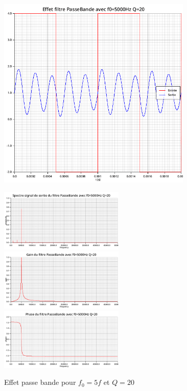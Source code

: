 \documentclass{article}
\begin{document}
\begin{figure}[H]
  \begin{minipage}{0.6\textwidth}
      \centering
      \includegraphics[width=25em]{images/creneau/bande/q=20/5/signals.png}
  \end{minipage}
  \begin{minipage}{0.3\textwidth}
      \centering
      \includegraphics[width=16em]{images/creneau/bande/q=20/5/fft_out.png}
      \vfill
      \includegraphics[width=16em]{images/creneau/bande/q=20/5/gain.png}
      \vfill
      \includegraphics[width=16em]{images/creneau/bande/q=20/5/phase.png}
  \end{minipage}
  \caption{Effet passe bande pour $f_0=5f$ et $Q=20$}
\end{figure}
\end{document}
